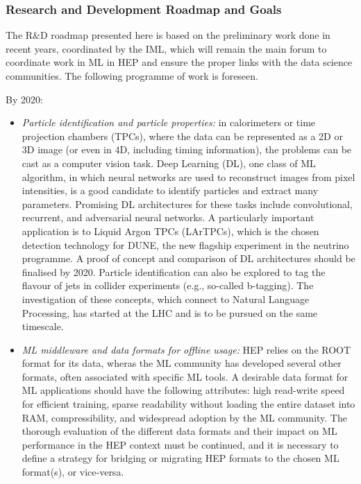 \subsubsection*{Research and Development Roadmap and Goals}

The R\&D roadmap presented here is based on the preliminary work done in
recent years, coordinated by the IML, which will remain the main
forum to coordinate work in ML in HEP and ensure the proper links
with the data science communities. The following programme of work is
foreseen.

By 2020:
\begin{itemize}
\item
  \emph{Particle identification and particle properties:} in calorimeters or
  time projection chambers (TPCs), where the data can be represented as
  a 2D or 3D image (or even in 4D, including timing information), the
  problems can be cast as a computer vision task. Deep Learning (DL),
  one class of ML algorithm, in which neural networks are used to
  reconstruct images from pixel intensities, is a good candidate to
  identify particles and extract many parameters. Promising DL
  architectures for these tasks include convolutional, recurrent, and
  adversarial neural networks. A particularly important application is
  to Liquid Argon TPCs (LArTPCs), which is the chosen detection
  technology for DUNE, the new flagship experiment in the neutrino programme.
  A proof of
  concept and comparison of DL architectures should be finalised by
  2020. Particle identification can also be explored to tag the flavour
  of jets in collider experiments (e.g., so-called b-tagging). The
  investigation of these concepts, which connect to Natural Language
  Processing, has started at the LHC and is to be pursued on the same
  timescale.
\item
  \emph{ML middleware and data formats for offline usage:} HEP relies
  on the ROOT format for its data, wheras the ML community
  has developed several other formats, often associated with specific ML
  tools. A desirable data format for ML applications should have the
  following attributes: high read-write speed for efficient training,
  sparse readability without loading the entire dataset into RAM,
  compressibility, and widespread adoption by the ML community. The thorough
  evaluation of the different data formats and their impact on ML
  performance in the HEP context must be continued, and it is necessary
  to define a strategy for bridging or migrating HEP formats to the
  chosen ML format(s), or vice-versa.

\end{itemize}
